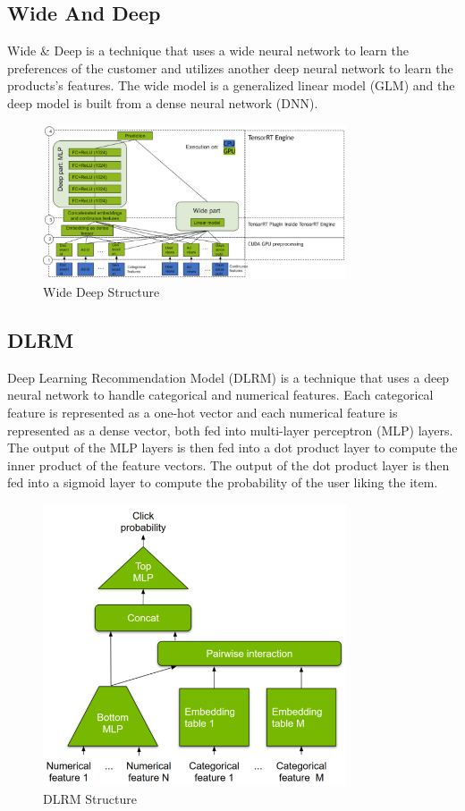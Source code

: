 \subsection{Wide And Deep}
Wide \& Deep is a technique that uses a wide neural network to learn the preferences of the customer and utilizes another deep neural network to learn the products's features. The wide model is a generalized linear model (GLM) and the deep model is built from a dense neural network (DNN).
\begin{figure}[H]
    \centering
    \includegraphics[width=0.8\textwidth]{assets/wide_deep.png}
    \caption[Wide Deep Structure]{Wide Deep Structure \cite{NvidiaRecSys}}
    \label{fig:wide-deep}
\end{figure}

\subsection{DLRM}
Deep Learning Recommendation Model (DLRM) is a technique that uses a deep neural network to handle categorical and numerical features. Each categorical feature is represented as a one-hot vector and each numerical feature is represented as a dense vector, both fed into multi-layer perceptron (MLP) layers. The output of the MLP layers is then fed into a dot product layer to compute the inner product of the feature vectors. The output of the dot product layer is then fed into a sigmoid layer to compute the probability of the user liking the item.
\begin{figure}[H]
    \centering
    \includegraphics[width=0.8\textwidth]{assets/dlrm.png}
    \caption[DLRM Structure]{DLRM Structure \cite{NvidiaRecSys}}
    \label{fig:dlrm}
\end{figure}

